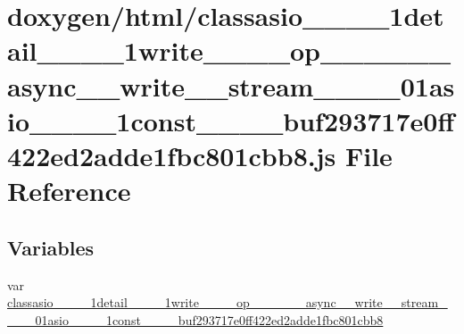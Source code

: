 \hypertarget{classasio____1____1detail____1____1write________op____3____01____async____write____stream____00_e60d84c6b0708b00b7ea328c79af6a4c}{}\section{doxygen/html/classasio\+\_\+\+\_\+\_\+\+\_\+1detail\+\_\+\+\_\+\_\+\+\_\+1write\+\_\+\+\_\+\+\_\+\+\_\+op\+\_\+\+\_\+\_\+\+\_\+\_\+\+\_\+async\+\_\+\+\_\+write\+\_\+\+\_\+stream\+\_\+\+\_\+\_\+\+\_\+01asio\+\_\+\+\_\+\_\+\+\_\+1const\+\_\+\+\_\+\+\_\+\+\_\+buf293717e0ff422ed2adde1fbc801cbb8.js File Reference}
\label{classasio____1____1detail____1____1write________op____3____01____async____write____stream____00_e60d84c6b0708b00b7ea328c79af6a4c}
\subsection*{Variables}
\begin{DoxyCompactItemize}
\item 
var \hyperlink{classasio____1____1detail____1____1write________op____3____01____async____write____stream____00_e60d84c6b0708b00b7ea328c79af6a4c_a093625b48f43c982ef9b65029969dedb}{classasio\+\_\+\+\_\+\_\+\+\_\+1detail\+\_\+\+\_\+\_\+\+\_\+1write\+\_\+\+\_\+\+\_\+\+\_\+op\+\_\+\+\_\+\_\+\+\_\+\_\+\+\_\+async\+\_\+\+\_\+write\+\_\+\+\_\+stream\+\_\+\+\_\+\_\+\+\_\+01asio\+\_\+\+\_\+\_\+\+\_\+1const\+\_\+\+\_\+\+\_\+\+\_\+buf293717e0ff422ed2adde1fbc801cbb8}
\end{DoxyCompactItemize}


